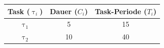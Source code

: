 \begin{frame}{\subsecname}
	\begin{center}
		\begin{tabular}{c||c|c}
				Task ($\uptau_i$) & Dauer ($C_i$) & Task-Periode ($T_i$)\\\hline\hline
				$\uptau_1$ & 5 & 15\\
				$\uptau_2$ & 10 & 40\\
		\end{tabular}
	\end{center}	
	
\end{frame}
